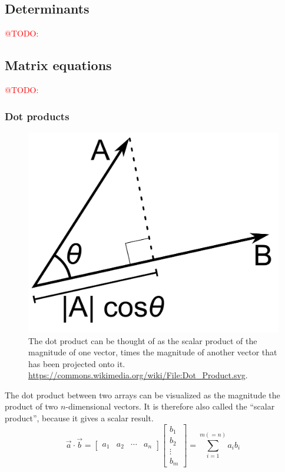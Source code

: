 \documentclass[a4paper,10pt]{scrartcl}
\makeatletter
\newcommand{\todo}[1]{\textcolor{red}{@TODO: #1}}
\makeatother
\begin{document}
\subsection{Determinants}

\todo{}

\subsection{Matrix equations}

\todo{}

\subsubsection{Dot products}

\begin{figure}[ht!]
\begin{center}
 \includegraphics[width=.5\linewidth]{figures/NumericalAndMath/Dot_Product.png}
\end{center}
 \caption{The dot product can be thought of as the scalar product of the magnitude of one vector, times the magnitude of another vector that has been projected onto it. \url{https://commons.wikimedia.org/wiki/File:Dot_Product.svg}.}
\end{figure}


The dot product between two arrays can be visualized as the magnitude the product of two $n$-dimensional vectors. It is therefore also called the ``scalar product'', because it gives a scalar result.
\begin{equation}
 \vec{a} \cdot \vec{b} =
 \begin{bmatrix}
  a_{1} & a_{2} & \cdots & a_{n}
 \end{bmatrix}
 \begin{bmatrix}
  b_{1} \\
  b_{2} \\
  \vdots \\
  b_{m}
 \end{bmatrix}
 = \sum_{i=1}^{m(=n)} a_i b_i
\end{equation}
\end{document}
